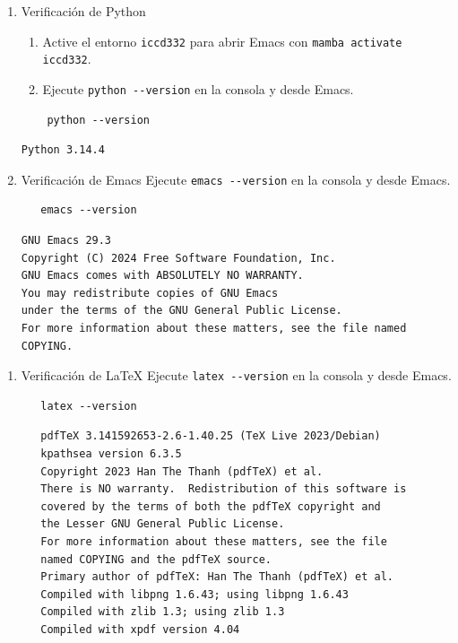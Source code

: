 \documentclass{article}
\begin{document}
\begin{enumerate}
\item Verificación de Python
\begin{enumerate}
\item Active el entorno \texttt{iccd332} para abrir Emacs con \texttt{mamba activate iccd332}.
\item Ejecute \texttt{python -{}-{}version} en la consola y desde Emacs.
\end{enumerate}

\begin{verbatim}
    python --version
\end{verbatim}

\begin{verbatim}
Python 3.14.4
\end{verbatim}

\item Verificación de Emacs
Ejecute \texttt{emacs -{}-{}version} en la consola y desde Emacs.

\begin{verbatim}
   emacs --version
\end{verbatim}

\begin{verbatim}
GNU Emacs 29.3
Copyright (C) 2024 Free Software Foundation, Inc.
GNU Emacs comes with ABSOLUTELY NO WARRANTY.
You may redistribute copies of GNU Emacs
under the terms of the GNU General Public License.
For more information about these matters, see the file named COPYING.
\end{verbatim}
\end{enumerate}


\begin{enumerate}
\item Verificación de \LaTeX{}
Ejecute \texttt{latex -{}-{}version} en la consola y desde Emacs.

\begin{verbatim}
   latex --version
\end{verbatim}

\begin{verbatim}
   pdfTeX 3.141592653-2.6-1.40.25 (TeX Live 2023/Debian)
   kpathsea version 6.3.5
   Copyright 2023 Han The Thanh (pdfTeX) et al.
   There is NO warranty.  Redistribution of this software is
   covered by the terms of both the pdfTeX copyright and
   the Lesser GNU General Public License.
   For more information about these matters, see the file
   named COPYING and the pdfTeX source.
   Primary author of pdfTeX: Han The Thanh (pdfTeX) et al.
   Compiled with libpng 1.6.43; using libpng 1.6.43
   Compiled with zlib 1.3; using zlib 1.3
   Compiled with xpdf version 4.04
\end{verbatim}
\end{enumerate}
\end{document}
